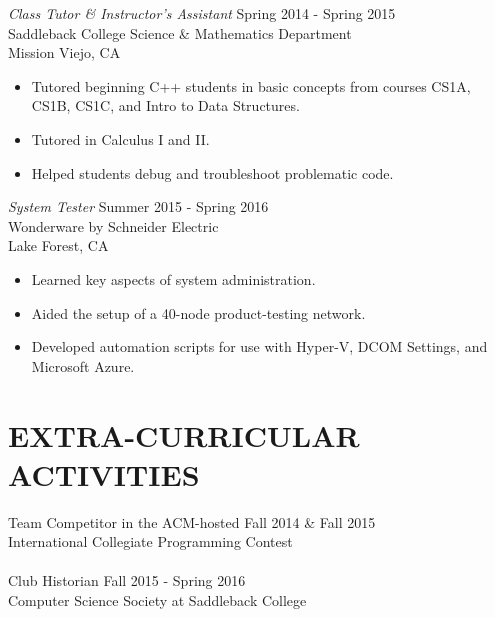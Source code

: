 \documentclass[margin, 10pt]{res} %
\begin{document}
\begin{resume}
{\sl Class Tutor \& Instructor's Assistant} \hfill Spring 2014 - Spring 2015 \\
Saddleback College Science \& Mathematics Department \\
Mission Viejo, CA

\begin{itemize} \itemsep -2pt %
\item Tutored beginning C++ students in basic concepts from courses \newline
CS1A, CS1B, CS1C, and Intro to Data Structures.
\item Tutored in Calculus I and II.
\item Helped students debug and troubleshoot problematic code.
\end{itemize}

{\sl System Tester} \hfill Summer 2015 - Spring 2016 \\
Wonderware by Schneider Electric \\
Lake Forest, CA

\begin{itemize} \itemsep -2pt
\item Learned key aspects of system administration.
\item Aided the setup of a 40-node product-testing network.
\item Developed automation scripts for use with \newline
Hyper-V, DCOM Settings, and Microsoft Azure.
\end{itemize}



\section{EXTRA-CURRICULAR \\ ACTIVITIES} 

Team Competitor in the ACM-hosted \hfill Fall 2014 \& Fall 2015 \\
International Collegiate Programming Contest \\ \\
Club Historian \hfill Fall 2015 - Spring 2016 \\
Computer Science Society at Saddleback College


\end{resume}
\end{document}
